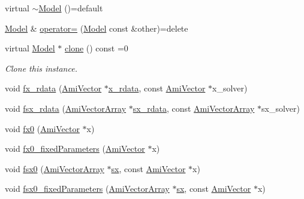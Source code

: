 \begin{DoxyCompactItemize}
\item 
virtual \mbox{\hyperlink{classamici_1_1_model_aae0d79bd804aefe47c7401520177f3e9}{$\sim$\+Model}} ()=default
\item 
\mbox{\hyperlink{classamici_1_1_model}{Model}} \& \mbox{\hyperlink{classamici_1_1_model_abcf360cf2836a5c7a7686a6a5c0c6bfa}{operator=}} (\mbox{\hyperlink{classamici_1_1_model}{Model}} const \&other)=delete
\item 
virtual \mbox{\hyperlink{classamici_1_1_model}{Model}} $\ast$ \mbox{\hyperlink{classamici_1_1_model_a109f753bb5889d6563476826f5a3666d}{clone}} () const =0
\begin{DoxyCompactList}\small\item\em Clone this instance. \end{DoxyCompactList}\item 
void \mbox{\hyperlink{classamici_1_1_model_a335850c2d4843d99cb03bb6101cf282d}{fx\+\_\+rdata}} (\mbox{\hyperlink{classamici_1_1_ami_vector}{Ami\+Vector}} $\ast$\mbox{\hyperlink{classamici_1_1_model_a297a15f378087de3c782f5af7f29510b}{x\+\_\+rdata}}, const \mbox{\hyperlink{classamici_1_1_ami_vector}{Ami\+Vector}} $\ast$x\+\_\+solver)
\item 
void \mbox{\hyperlink{classamici_1_1_model_aa19d5feeb75bc472ce6244790ebf765b}{fsx\+\_\+rdata}} (\mbox{\hyperlink{classamici_1_1_ami_vector_array}{Ami\+Vector\+Array}} $\ast$\mbox{\hyperlink{classamici_1_1_model_a61ffc2a1fd9c46b5869ab4321e70d791}{sx\+\_\+rdata}}, const \mbox{\hyperlink{classamici_1_1_ami_vector_array}{Ami\+Vector\+Array}} $\ast$sx\+\_\+solver)
\item 
void \mbox{\hyperlink{classamici_1_1_model_aa9a9e12a414d9ac91249b63d01ab7bca}{fx0}} (\mbox{\hyperlink{classamici_1_1_ami_vector}{Ami\+Vector}} $\ast$x)
\item 
void \mbox{\hyperlink{classamici_1_1_model_ae517574d2a7c504c388438a08a1aed38}{fx0\+\_\+fixed\+Parameters}} (\mbox{\hyperlink{classamici_1_1_ami_vector}{Ami\+Vector}} $\ast$x)
\item 
void \mbox{\hyperlink{classamici_1_1_model_a6f46a63f0524ad25e4125254b78fdee9}{fsx0}} (\mbox{\hyperlink{classamici_1_1_ami_vector_array}{Ami\+Vector\+Array}} $\ast$\mbox{\hyperlink{classamici_1_1_model_ac3288cc7f649605938f1fd1b459d3d8c}{sx}}, const \mbox{\hyperlink{classamici_1_1_ami_vector}{Ami\+Vector}} $\ast$x)
\item 
void \mbox{\hyperlink{classamici_1_1_model_acd951497e01220e545bbb238cc48e7bb}{fsx0\+\_\+fixed\+Parameters}} (\mbox{\hyperlink{classamici_1_1_ami_vector_array}{Ami\+Vector\+Array}} $\ast$\mbox{\hyperlink{classamici_1_1_model_ac3288cc7f649605938f1fd1b459d3d8c}{sx}}, const \mbox{\hyperlink{classamici_1_1_ami_vector}{Ami\+Vector}} $\ast$x)

\end{DoxyCompactItemize}
